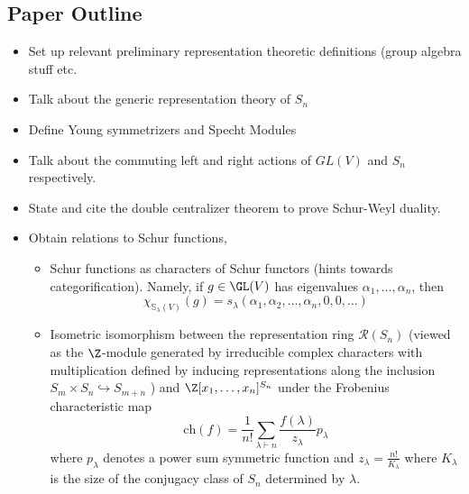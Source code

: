 \documentclass[12pt]{article}
\newcommand{\Jenn}[1]{\todo[size=\tiny]{#1
      \\ \hfill --- Jenn}}
\begin{document}
\subsection{Paper Outline}
\begin{itemize}
  \item Set up relevant preliminary representation theoretic definitions (group algebra stuff etc.
  \item Talk about the generic representation theory of $ S_{n} $ 
  \item Define Young symmetrizers and Specht Modules 
  \item Talk about the commuting left and right actions of $ GL(V) $ and $ S_{n} $ respectively.
  \item State and cite the double centralizer theorem to prove Schur-Weyl duality. 
  \item Obtain relations to Schur functions,  %
  \begin{itemize}
    \item Schur functions as characters of Schur functors (hints towards categorification). Namely, if $ g\in \GL(V) $ has eigenvalues $ \alpha_{1},\ldots,\alpha_{n} $, then 
      \[
        \chi_{\mathbb{S}_{\lambda}(V)}(g) = s_{\lambda}(\alpha_{1},\alpha_{2},\ldots, \alpha_{n},0,0,\ldots)
      \]
    \item Isometric isomorphism between the representation ring $ \mathcal{R}(S_{n}) $ (viewed as the $ \Z $-module generated by irreducible complex characters with multiplication defined by inducing representations along the inclusion $ S_{m}\times S_{n}\hookrightarrow S_{m+n} $ ) and $ \Z[x_{1},\ldots,x_{n}]^{S_{n}} $ under the Frobenius characteristic map 
      \[
        \mathrm{ch}(f) = \frac{1}{n!}\sum_{\lambda\vdash n} \frac{f(\lambda)}{z_{\lambda}}p_{\lambda}
      \]
      where $ p_{\lambda} $ denotes a power sum symmetric function and $ z_{\lambda} = \frac{n!}{K_{\lambda}} $ where $ K_{\lambda} $ is the size of the conjugacy class of $ S_{n} $ determined by $ \lambda $.
  \end{itemize}
\end{itemize}
\end{document}
